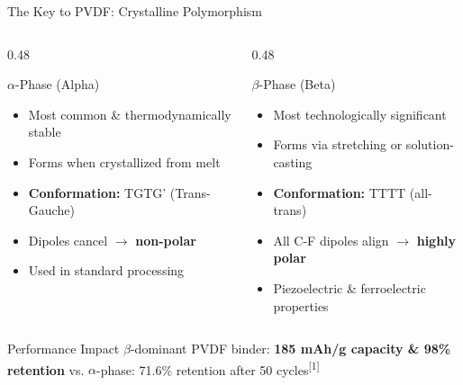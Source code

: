 \documentclass[aspectratio=169]{beamer}
\begin{document}
\begin{frame}{The Key to PVDF: Crystalline Polymorphism}
    \begin{columns}[T]
        \begin{column}{0.48\textwidth}
            \begin{block}{$\alpha$-Phase (Alpha)}
                \begin{itemize}\small
                    \item Most common \& thermodynamically stable
                    \item Forms when crystallized from melt
                    \item \textbf{Conformation:} TGTG' (Trans-Gauche)
                    \item Dipoles cancel $\rightarrow$ \textbf{non-polar}
                    \item Used in standard processing
                \end{itemize}
            \end{block}
        \end{column}
        
        \begin{column}{0.48\textwidth}
            \begin{alertblock}{$\beta$-Phase (Beta)}
                \begin{itemize}\small
                    \item Most technologically significant
                    \item Forms via stretching or solution-casting
                    \item \textbf{Conformation:} TTTT (all-trans)
                    \item All C-F dipoles align $\rightarrow$ \textbf{highly polar}
                    \item Piezoelectric \& ferroelectric properties
                \end{itemize}
            \end{alertblock}
        \end{column}
    \end{columns}
    
    \vspace{0.3cm}
    \begin{exampleblock}{Performance Impact}
        $\beta$-dominant PVDF binder: \textbf{185 mAh/g capacity \& 98\% retention} vs. $\alpha$-phase: 71.6\% retention after 50 cycles\textsuperscript{[1]}
    \end{exampleblock}
\end{frame}
\end{document}
